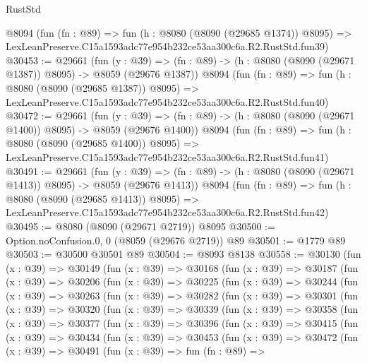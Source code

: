 \begin{lexlean}{RustStd}
\begin{coremodule}
    @8094
    (fun (fn : @89) =>
    fun (h : @8080 (@8090 (@29685 @1374)) @8095) =>
    LexLeanPreserve.C15a1593adc77e954b232ce53aa300c6a.R2.RustStd.fun39)
@30453 := @29661
    (fun (y : @39) =>
    (fn : @89) -> (h : @8080 (@8090 (@29671 @1387)) @8095) -> @8059 (@29676 @1387))
    @8094
    (fun (fn : @89) =>
    fun (h : @8080 (@8090 (@29685 @1387)) @8095) =>
    LexLeanPreserve.C15a1593adc77e954b232ce53aa300c6a.R2.RustStd.fun40)
@30472 := @29661
    (fun (y : @39) =>
    (fn : @89) -> (h : @8080 (@8090 (@29671 @1400)) @8095) -> @8059 (@29676 @1400))
    @8094
    (fun (fn : @89) =>
    fun (h : @8080 (@8090 (@29685 @1400)) @8095) =>
    LexLeanPreserve.C15a1593adc77e954b232ce53aa300c6a.R2.RustStd.fun41)
@30491 := @29661
    (fun (y : @39) =>
    (fn : @89) -> (h : @8080 (@8090 (@29671 @1413)) @8095) -> @8059 (@29676 @1413))
    @8094
    (fun (fn : @89) =>
    fun (h : @8080 (@8090 (@29685 @1413)) @8095) =>
    LexLeanPreserve.C15a1593adc77e954b232ce53aa300c6a.R2.RustStd.fun42)
@30495 := @8080 (@8090 (@29671 @2719)) @8095
@30500 := Option.noConfusion.{0, 0} (@8059 (@29676 @2719)) @89
@30501 := @1779 @89
@30503 := @30500 @30501 @89
@30504 := @8093 @8138
@30558 := @30130
    (fun (x : @39) =>
    @30149
      (fun (x : @39) =>
      @30168
        (fun (x : @39) =>
        @30187
          (fun (x : @39) =>
          @30206
            (fun (x : @39) =>
            @30225
              (fun (x : @39) =>
              @30244
                (fun (x : @39) =>
                @30263
                  (fun (x : @39) =>
                  @30282
                    (fun (x : @39) =>
                    @30301
                      (fun (x : @39) =>
                      @30320
                        (fun (x : @39) =>
                        @30339
                          (fun (x : @39) =>
                          @30358
                            (fun (x : @39) =>
                            @30377
                              (fun (x : @39) =>
                              @30396
                                (fun (x : @39) =>
                                @30415
                                  (fun (x : @39) =>
                                  @30434
                                    (fun (x : @39) =>
                                    @30453
                                      (fun (x : @39) =>
                                      @30472
                                        (fun (x : @39) =>
                                        @30491
                                          (fun (x : @39) =>
                                          fun (fn : @89) =>

\end{coremodule}
\end{lexlean}
